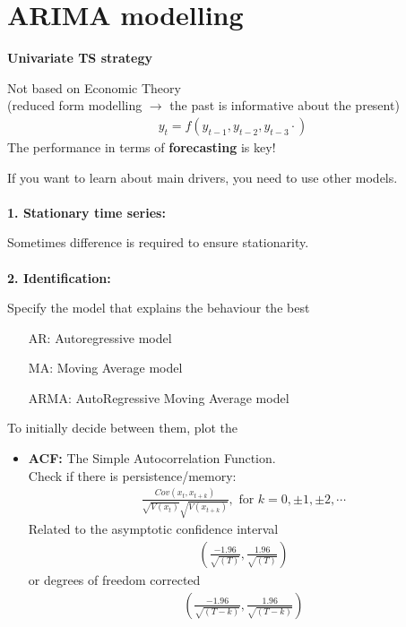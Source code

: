 \section{ARIMA modelling}
\begin{multicols}{2}\noindent
 \textbf{Univariate TS strategy}\par
 Not based on Economic Theory\\
 (reduced form modelling $\rightarrow$ the past is informative about the present)
 \begin{align*}
  y_t = f(y_{t-1},y_{t-2},y_{t-3}\cdot)
 \end{align*}
 The performance in terms of \textbf{forecasting} is key!\par
 If you want to learn about main drivers, you need to use other models.\\
 \\
 \textbf{1. Stationary time series:}\par
 Sometimes  difference is required to ensure stationarity.\\
 \\
 \textbf{2. Identification:}\par
 Specify the model that explains the behaviour the best
 \begin{itemize}
  \item[AR:] Autoregressive model
  \item[MA:] Moving Average model
  \item[ARMA:] AutoRegressive Moving Average model
 \end{itemize}
 To initially decide between them, plot the
 \begin{itemize}
  \item \textbf{ACF:} The Simple Autocorrelation Function.\\
        Check if there is persistence/memory:
        \begin{align*}
         \frac{Cov(x_t,x_{t+k})}{\sqrt{V(x_t)}\sqrt{V(x_{t+k})}},\textrm{     for }k=0,\pm1,\pm2,\cdots
        \end{align*}
        Related to the asymptotic confidence interval
        \begin{align*}
         \left(\frac{-1.96}{\sqrt{(T)}}, \frac{1.96}{\sqrt{(T)}}  \right)
        \end{align*}
        or degrees of freedom corrected
        \begin{align*}
         \left(\frac{-1.96}{\sqrt{(T-k)}}, \frac{1.96}{\sqrt{(T-k)}}  \right)
        \end{align*}

\end{itemize}
\end{multicols}

